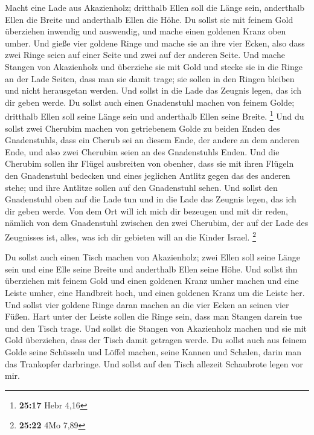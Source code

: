  Macht eine Lade aus Akazienholz; dritthalb Ellen soll die
Länge sein, anderthalb Ellen die Breite und anderthalb Ellen die Höhe.
 Du sollst sie mit feinem Gold überziehen inwendig und
auswendig, und mache einen goldenen Kranz oben umher.  Und
gieße vier goldene Ringe und mache sie an ihre vier Ecken, also dass
zwei Ringe seien auf einer Seite und zwei auf der anderen Seite.
 Und mache Stangen von Akazienholz und überziehe sie mit
Gold  und stecke sie in die Ringe an der Lade Seiten, dass
man sie damit trage;  sie sollen in den Ringen bleiben und
nicht herausgetan werden.  Und sollst in die Lade das
Zeugnis legen, das ich dir geben werde.  Du sollst auch
einen Gnadenstuhl machen von feinem Golde; dritthalb Ellen soll seine
Länge sein und anderthalb Ellen seine Breite. \footnote{\textbf{25:17}
  Hebr 4,16}  Und du sollst zwei Cherubim machen von
getriebenem Golde zu beiden Enden des Gnadenstuhls,  dass
ein Cherub sei an diesem Ende, der andere an dem anderen Ende, und also
zwei Cherubim seien an des Gnadenstuhls Enden.  Und die
Cherubim sollen ihr Flügel ausbreiten von obenher, dass sie mit ihren
Flügeln den Gnadenstuhl bedecken und eines jeglichen Antlitz gegen das
des anderen stehe; und ihre Antlitze sollen auf den Gnadenstuhl sehen.
 Und sollst den Gnadenstuhl oben auf die Lade tun und in
die Lade das Zeugnis legen, das ich dir geben werde.  Von
dem Ort will ich mich dir bezeugen und mit dir reden, nämlich von dem
Gnadenstuhl zwischen den zwei Cherubim, der auf der Lade des Zeugnisses
ist, alles, was ich dir gebieten will an die Kinder Israel. \footnote{\textbf{25:22}
  4Mo 7,89}

 Du sollst auch einen Tisch machen von Akazienholz; zwei
Ellen soll seine Länge sein und eine Elle seine Breite und anderthalb
Ellen seine Höhe.  Und sollst ihn überziehen mit feinem
Gold und einen goldenen Kranz umher machen  und eine Leiste
umher, eine Handbreit hoch, und einen goldenen Kranz um die Leiste her.
 Und sollst vier goldene Ringe daran machen an die vier
Ecken an seinen vier Füßen.  Hart unter der Leiste sollen
die Ringe sein, dass man Stangen darein tue und den Tisch trage.
 Und sollst die Stangen von Akazienholz machen und sie mit
Gold überziehen, dass der Tisch damit getragen werde.  Du
sollst auch aus feinem Golde seine Schüsseln und Löffel machen, seine
Kannen und Schalen, darin man das Trankopfer darbringe. 
Und sollst auf den Tisch allezeit Schaubrote legen vor mir.

